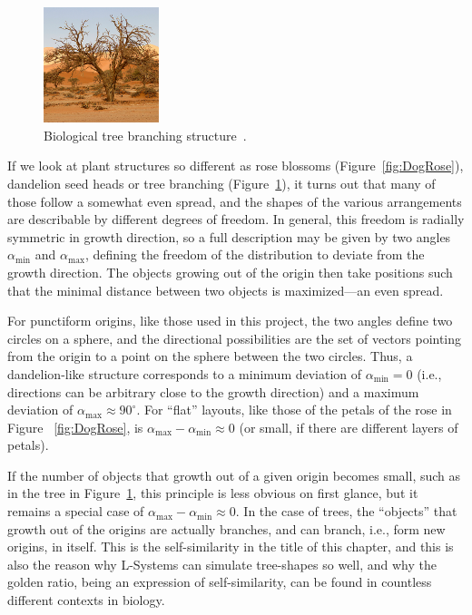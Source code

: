 \documentclass[11pt, abstract=on]{scrartcl}
\begin{document}
\begin{figure} 
 	\centering
 		\includegraphics[width=0.3\textwidth]{Pic_Tree.png}
 	\caption{Biological tree branching structure~\cite{WikipediaTree}.}
 	\label{fig:IRLTree}
\end{figure}

If we look at plant structures so different as rose blossoms (Figure~\ref{fig:DogRose}), dandelion seed heads or tree branching (Figure~\ref{fig:IRLTree}), it turns out that many of those follow a somewhat even spread, and the shapes of the various arrangements are describable by different degrees of freedom. In general, this freedom is radially symmetric in growth direction, so a full description may be given by two angles $\alpha_\text{min}$ and $\alpha_\text{max}$, defining the freedom of the distribution to deviate from the growth direction. The objects growing out of the origin then take positions such that the minimal distance between two objects is maximized---an even spread.

For punctiform origins, like those used in this project, the two angles define two circles on a sphere, and the directional possibilities are the set of vectors pointing from the origin to a point on the sphere between the two circles. Thus, a dandelion-like structure corresponds to a minimum deviation of $\alpha_\text{min} = 0$ (i.e., directions can be arbitrary close to the growth direction) and a maximum deviation of 
$\alpha_\text{max} \approx 90^\circ$. For ``flat'' layouts, like those of the petals of the rose in Figure~ \ref{fig:DogRose}, is $\alpha_\text{max} - \alpha_\text{min} \approx 0$ (or small, if there are different layers of petals).

If the number of objects that growth out of a given origin becomes small, such as in the tree in Figure~\ref{fig:IRLTree}, this principle is less obvious on first glance, but it remains a special case of $\alpha_\text{max} - \alpha_\text{min} \approx 0$. In the case of trees, the ``objects'' that growth out of the origins are actually branches, and can branch, i.e., form new origins, in itself. This is the self-similarity in the title of this chapter, and this is also the reason why L-Systems can simulate tree-shapes so well, and why the golden ratio, being an expression of self-similarity, can be found in countless different contexts in biology.
\end{document}
